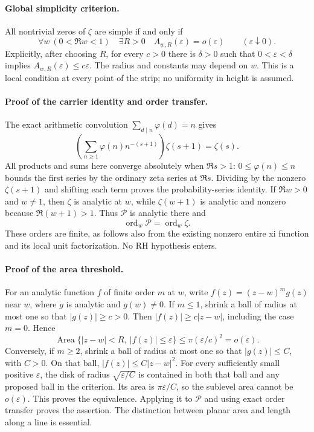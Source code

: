 \paragraph{Global simplicity criterion.}
All nontrivial zeros of \(\zeta\) are simple if and only if
\[
 \forall w\ (0<\Re w<1)\quad\exists R>0\quad
 A_{w,R}(\varepsilon)=o(\varepsilon)
       \qquad(\varepsilon\downarrow0).
\]
Explicitly, after choosing \(R\), for every \(c>0\) there is
\(\delta>0\) such that
\(0<\varepsilon<\delta\) implies
\(A_{w,R}(\varepsilon)\le c\varepsilon\).
The radius and constants may depend on \(w\). This is a local condition
at every point of the strip; no uniformity in height is assumed.

\paragraph{Proof of the carrier identity and order transfer.}
The exact arithmetic convolution
\(\sum_{d\mid n}\varphi(d)=n\) gives
\[
 \left(\sum_{n\ge1}\varphi(n)n^{-(s+1)}\right)\zeta(s+1)=\zeta(s).
\]
All products and sums here converge absolutely when \(\Re s>1\):
\(0\le\varphi(n)\le n\) bounds the first series by the ordinary
zeta series at \(\Re s\). Dividing by the nonzero \(\zeta(s+1)\)
and shifting each term proves the probability-series identity.
If \(\Re w>0\) and \(w\ne1\), then \(\zeta\) is analytic at \(w\),
while \(\zeta(w+1)\) is analytic and nonzero because
\(\Re(w+1)>1\). Thus \(\mathcal P\) is analytic there and
\[
 \operatorname{ord}_w\mathcal P=\operatorname{ord}_w\zeta.
\]
These orders are finite, as follows also from the existing nonzero entire
xi function and its local unit factorization. No RH hypothesis enters.

\paragraph{Proof of the area threshold.}
For an analytic function \(f\) of finite order \(m\) at \(w\), write
\(f(z)=(z-w)^m g(z)\) near \(w\), where \(g\) is analytic and
\(g(w)\ne0\). If \(m\le1\), shrink a ball of radius at most one
so that \(|g(z)|\ge c>0\). Then
\(|f(z)|\ge c|z-w|\), including the case \(m=0\). Hence
\[
 \operatorname{Area}\{|z-w|<R,\ |f(z)|\le\varepsilon\}
       \le\pi(\varepsilon/c)^2=o(\varepsilon).
\]
Conversely, if \(m\ge2\), shrink a ball of radius at most one so
that \(|g(z)|\le C\), with \(C>0\). On that ball,
\(|f(z)|\le C|z-w|^2\). For every sufficiently small positive
\(\varepsilon\), the disk of radius \(\sqrt{\varepsilon/C}\)
is contained in both that ball and any proposed ball in the criterion.
Its area is \(\pi\varepsilon/C\), so the sublevel area cannot be
\(o(\varepsilon)\). This proves the equivalence. Applying it to
\(\mathcal P\) and using exact order transfer proves the assertion.
The distinction between planar area and length along a line is essential.

